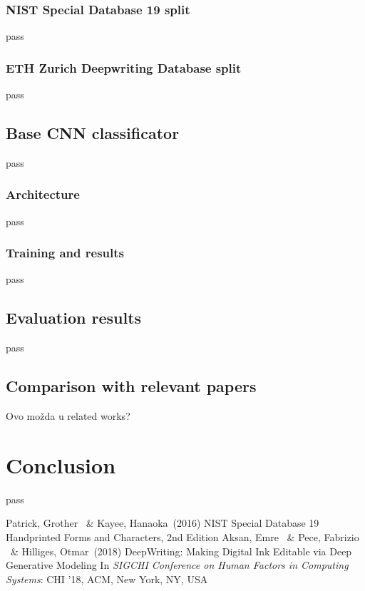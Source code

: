 \documentclass{article}
\begin{document}
\subsubsection{NIST Special Database 19 split}
pass \citet{nist}

\subsubsection{ETH Zurich Deepwriting Database split}
pass \cite{deepwriting}

\subsection{Base CNN classificator}
pass

\subsubsection{Architecture}
pass 

\subsubsection{Training and results}
pass

\subsection{Evaluation results}
pass

\subsection{Comparison with relevant papers}
Ovo možda u related works?

\section{Conclusion}
pass 

\small

\begin{thebibliography}{99} 
   Patrick, Grother \ \&  Kayee, Hanaoka\ (2016) NIST Special Database 19 Handprinted Forms and Characters, 2nd Edition
   Aksan, Emre \ \& Pece, Fabrizio \ \& Hilliges, Otmar\ (2018) DeepWriting: Making Digital Ink Editable via Deep Generative Modeling
  In {\itshape SIGCHI Conference on Human Factors in Computing Systems}: CHI '18, ACM, New York, NY, USA
\end{thebibliography}
\end{document}
